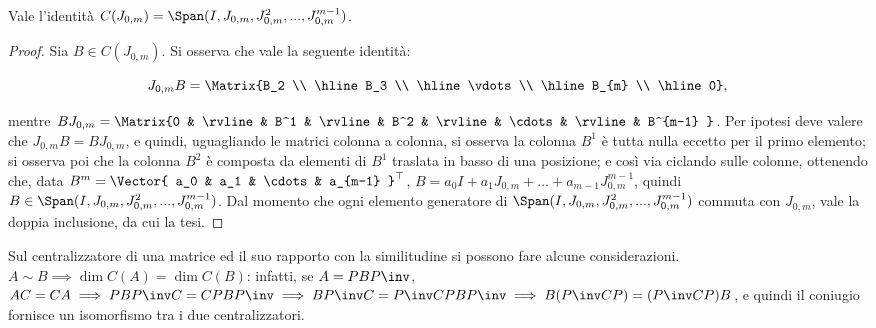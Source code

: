 \documentclass[11pt]{article}
\begin{document}
	\begin{proposition}
		Vale l'identità $C(J_{0, m}) = \Span(I, J_{0, m}, J_{0, m}^2, ..., J_{0, m}^{m-1})$.
	\end{proposition}

	\begin{proof}
		Sia $B \in C(J_{0, m})$. Si osserva che vale la seguente identità:
		
		\[ J_{0,m} B = \Matrix{B_2 \\ \hline B_3 \\ \hline \vdots \\ \hline B_{m} \\ \hline 0}, \]
		
		\vskip 0.05in
		
		mentre $B J_{0,m} = \Matrix{0 & \rvline & B^1 & \rvline & B^2 & \rvline & \cdots & \rvline & B^{m-1} }$. Per ipotesi deve valere che $J_{0,m} B = B J_{0,m}$, e quindi, uguagliando le matrici colonna a colonna, si osserva
		la colonna $B^1$ è tutta nulla eccetto per il primo elemento; si osserva poi che la colonna $B^2$ è composta
		da elementi di $B^1$ traslata in basso di una posizione; e così via ciclando sulle colonne, ottenendo che,
		data $B^m = \Vector{ a_0 & a_1 & \cdots & a_{m-1} }^\top$, $B = a_0 I + a_1 J_{0,m} + \ldots + a_{m-1} J_{0, m}^{m-1}$,
		quindi $B \in \Span(I, J_{0, m}, J_{0, m}^2, ..., J_{0, m}^{m-1})$. Dal momento che ogni elemento generatore di
		$\Span(I, J_{0, m}, J_{0, m}^2, ..., J_{0, m}^{m-1})$ commuta con $J_{0,m}$, vale la doppia inclusione, da cui
		la tesi.
	\end{proof}

	\begin{remark}
		Sul centralizzatore di una matrice ed il suo rapporto con la
		similitudine si possono fare alcune considerazioni. \\
		
		\li $A \sim B \implies \dim C(A) = \dim C(B)$: infatti, se
		$A = PBP\inv$, $AC = CA \implies PBP\inv C = C PBP\inv \implies
		BP\inv C=P\inv C P B P\inv \implies B (P\inv C P) = (P\inv C P) B$,
		e quindi il coniugio fornisce un isomorfismo tra i due
		centralizzatori.
	\end{remark}
	
\end{document}
